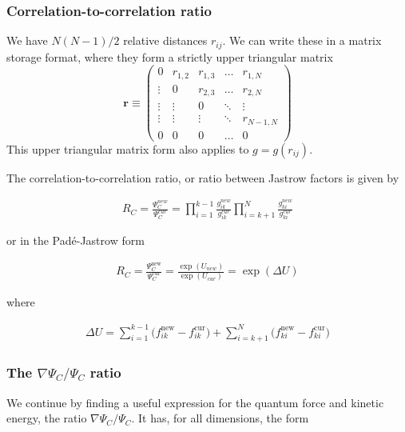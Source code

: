 \documentclass[x11names]{article}
\begin{document}
		\subsubsection{Correlation-to-correlation ratio}
			We have $N\left(N-1\right)/2$ relative distances $r_{ij}$. We can
			write these in a matrix storage format, where they form a strictly
			upper triangular matrix
			\[
			\mathbf{r}\equiv\left(\begin{array}{ccccc}
			0 & r_{1,2} & r_{1,3} & \dots & r_{1,N}\\
			\vdots & 0 & r_{2,3} & \dots & r_{2,N}\\
			\vdots & \vdots & 0 & \ddots & \vdots\\
			\vdots & \vdots & \vdots & \ddots & r_{N-1,N}\\
			0 & 0 & 0 & \dots & 0
			\end{array}\right)
			\]
			This upper triangular matrix form also applies to $g=g\left(r_{ij}\right)$.

			The correlation-to-correlation ratio, or ratio between Jastrow factors
			is given by

			\begin{align}
				R_{C}=\frac{\Psi_{C}^{new}}{\Psi_{C}^{cur}}=\prod_{i=1}^{k-1}\frac{g_{ik}^{new}}{g_{ik}^{cur}}\prod_{i=k+1}^{N}\frac{g_{ki}^{new}}{g_{ki}^{cur}}
			\end{align}

			or in the Padé-Jastrow form

			\begin{align}
				R_{C}=\frac{\Psi_{C}^{\mathrm{new}}}{\Psi_{C}^{\mathrm{cur}}}=\frac{\exp\left(U_{new}\right)}{\exp\left(U_{cur}\right)}=\exp\left(\Delta U\right)
			\end{align}

			where

			\begin{align}
				\Delta U =
				\sum_{i=1}^{k-1}\big(f_{ik}^\mathrm{new}-f_{ik}^\mathrm{cur}\big)
				+
				\sum_{i=k+1}^{N}\big(f_{ki}^\mathrm{new}-f_{ki}^\mathrm{cur}\big)
			\end{align}

		\subsubsection{The $\nabla \Psi_{C}/\Psi_{C}$ ratio}
			We continue by finding a useful expression for the quantum force and kinetic energy, the ratio $\nabla\Psi_{C}/\Psi_{C}$. It has,
			for all dimensions, the form
\end{document}
